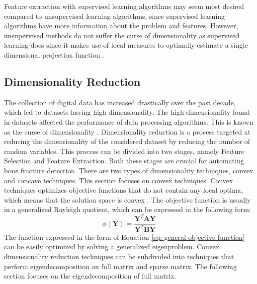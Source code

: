 \documentclass[11pt,twocolumn]{witseiepaper}
\begin{document}
	Feature extraction with supervised learning algorithms may seem most desired compared to unsupervised learning algorithms, since supervised learning algorithms have more information about the problem and features. However, unsupervised methods do not suffer the curse of dimensionality as supervised learning does since it makes use of local measures to optimally estimate a single dimensional projection function \cite{intrator_feature_1992}.
	
	\subsection{Dimensionality Reduction}
	The collection of digital data has increased drastically over the past decade, which led to datasets having high dimensionality. The high dimensionality found in datasets affected the performance of data processing algorithms. This is known as the curse of dimensionality \cite{Center2002}. Dimensionality reduction is a process targeted at reducing the dimensionality of the considered dataset by reducing the number of random variables. This process can be divided into two stages, namely Feature Selection and Feature Extraction. Both these stages are crucial for automating bone fracture detection. There are two types of dimensionality techniques, convex and concave techniques. This section focuses on convex techniques. Convex techniques optimizes objective functions that do not contain any local optima, which means that the solution space is convex \cite{Boyd2010}. The objective function is usually in a generalized Rayleigh quotient, which can be expressed in the following form: 
	\begin{equation}
	\phi(\textbf{Y}) = \frac{\textbf{Y}^{T}\textbf{AY}}{\textbf{Y}^{T}\textbf{BY}}
	\label{eq: general objective function}
	\end{equation}
	The function expressed in the form of Equation \ref{eq: general objective function} can be easily optimized by solving a generalized eigenproblem. Convex dimensionality reduction techniques can be subdivided into techniques that perform eigendecomposition on full matrix and sparse matrix. The following section focuses on the eigendecomposition of full matrix. 
	
\end{document}
